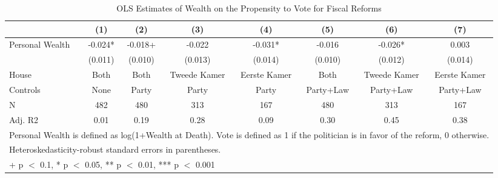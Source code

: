 \begin{table}

\caption{\label{tab:baseline_ols}OLS Estimates of Wealth on the Propensity to Vote for Fiscal Reforms}
\centering
\begin{tabular}[t]{lccccccc}
\toprule
  & (1) & (2) & (3) & (4) & (5) & (6) & (7)\\
\midrule
Personal Wealth & -0.024* & -0.018+ & -0.022 & -0.031* & -0.016 & -0.026* & 0.003\\
 & (0.011) & (0.010) & (0.013) & (0.014) & (0.010) & (0.012) & (0.014)\\
\midrule
House & Both & Both & Tweede Kamer & Eerste Kamer & Both & Tweede Kamer & Eerste Kamer\\
Controls & None & Party & Party & Party & Party+Law & Party+Law & Party+Law\\
N & 482 & 480 & 313 & 167 & 480 & 313 & 167\\
Adj. R2 & 0.01 & 0.19 & 0.28 & 0.09 & 0.30 & 0.45 & 0.38\\
\bottomrule
\multicolumn{8}{l}{\rule{0pt}{1em}Personal Wealth is defined as log(1+Wealth at Death). Vote is defined as 1 if the politician is in favor of the reform, 0 otherwise.}\\
\multicolumn{8}{l}{\rule{0pt}{1em}Heteroskedasticity-robust standard errors in parentheses.}\\
\multicolumn{8}{l}{\rule{0pt}{1em}+ p $<$ 0.1, * p $<$ 0.05, ** p $<$ 0.01, *** p $<$ 0.001}\\
\end{tabular}
\end{table}
